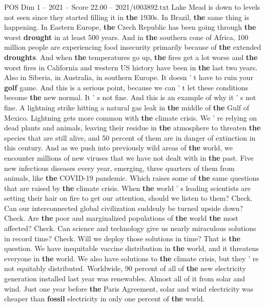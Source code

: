 \begin{textsample}{POS Dim 1 – 2021 – Score 22.00 – 2021/t003892.txt}
Lake Mead is down to levels not seen since they started filling it in \textbf{the} 1930s.
In Brazil, \textbf{the} same thing is happening.
In Eastern Europe, \textbf{the} Czech Republic has been going through \textbf{the} worst \textbf{drought} in at least 500 years.
And in \textbf{the} southern cone of Africa, 100 million people are experiencing food insecurity primarily because of \textbf{the} extended \textbf{droughts}.
And when \textbf{the} temperatures go up, \textbf{the} fires get a lot worse and \textbf{the} worst fires in California and western US history have been in \textbf{the} last two years.
Also in Siberia, in Australia, in southern Europe.
It doesn ' t have to ruin your \textbf{golf} game.
And this is a serious point, because we can ' t let these conditions become \textbf{the} new normal.
It ' s not fine.
And this is an example of why it ' s not fine.
A lightning strike hitting a natural gas leak in \textbf{the} middle of \textbf{the} Gulf of Mexico.
Lightning gets more common with \textbf{the} climate crisis.
We ' re relying on dead plants and animals, leaving their residue in \textbf{the} atmosphere to threaten \textbf{the} species that are still alive, and 50 percent of them are in danger of extinction in this century.
And as we push into previously wild areas of \textbf{the} world, we encounter millions of new viruses that we have not dealt with in \textbf{the} past.
Five new infectious diseases every year, emerging, three quarters of them from animals, like \textbf{the} COVID-19 pandemic.
Which raises some of \textbf{the} same questions that are raised by \textbf{the} climate crisis.
When \textbf{the} world ' s leading scientists are setting their hair on fire to get our attention, should we listen to them?
Check.
Can our interconnected global civilization suddenly be turned upside down?
Check.
Are \textbf{the} poor and marginalized populations of \textbf{the} world \textbf{the} most affected?
Check.
Can science and technology give us nearly miraculous solutions in record time?
Check.
Will we deploy those solutions in time?
That is \textbf{the} question.
We have inequitable vaccine distribution in \textbf{the} world, and it threatens everyone in \textbf{the} world.
We also have solutions to \textbf{the} climate crisis, but they ' re not equitably distributed.
Worldwide, 90 percent of all of \textbf{the} new electricity generation installed last year was renewables.
Almost all of it from solar and wind.
Just one year before \textbf{the} Paris Agreement, solar and wind electricity was cheaper than \textbf{fossil} electricity in only one percent of \textbf{the} world.

\end{textsample}
